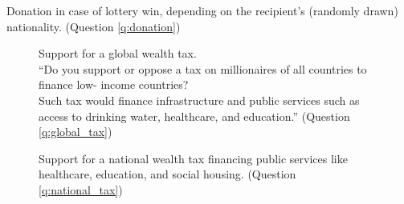 \begin{table}[h]
    \caption[Donation to Africa vs. own country]{Donation in case of lottery win, depending on the recipient's (randomly drawn) nationality. (Question \ref{q:donation})} \label{tab:donation}
    \makebox[\textwidth][c]{}
\end{table}

\begin{figure}[h!]
    \caption[Support for a global wealth tax]{Support for a global wealth tax. \\
    ``Do you support or oppose a tax on millionaires of all countries to finance low-
    income countries? \\
    Such tax would finance infrastructure and public services such as access to drinking water, healthcare, and education.'' (Question \ref{q:global_tax})}\label{fig:global_tax}
\end{figure}

\begin{figure}[h!]
    \caption[Support for a national wealth tax]{Support for a national wealth tax financing public services like healthcare, education, and social housing. (Question \ref{q:national_tax})}\label{fig:national_tax}
\end{figure}

